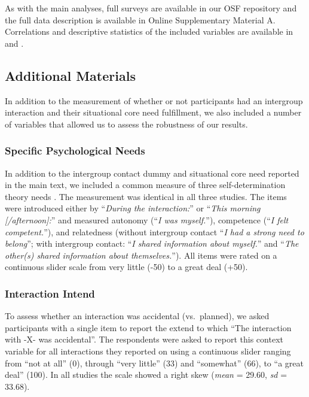 As with the main analyses, full surveys are available in our OSF
repository \citep{KreienkampMasked2022a} and the full data description
is available in Online Supplementary Material A. Correlations and
descriptive statistics of the included variables are available in
 and .

\subsection{Additional Materials}

In addition to the measurement of whether or not participants had an
intergroup interaction and their situational core need fulfillment, we
also included a number of variables that allowed us to assess the
robustness of our results.

\subsubsection{Specific Psychological Needs}

In addition to the intergroup contact dummy and situational core need
reported in the main text, we included a common measure of three
self-determination theory needs \citep[see][]{Downie2008}. The
measurement was identical in all three studies. The items were
introduced either by ``\textit{During the interaction:}'' or
``\textit{This morning [/afternoon]:}'' and measured autonomy
(``\textit{I was myself.}''), competence
(``\textit{I felt competent.}''), and relatedness (without intergroup
contact ``\textit{I had a strong need to belong}''; with intergroup
contact: ``\textit{I shared information about myself.}'' and
``\textit{The other(s) shared information about themselves.}''). All
items were rated on a continuous slider scale from very little (-50) to
a great deal (+50).

\subsubsection{Interaction Intend}

To assess whether an interaction was accidental (vs.~planned), we asked
participants with a single item to report the extend to which ``The
interaction with -X- was accidental''. The respondents were asked to
report this context variable for all interactions they reported on using
a continuous slider ranging from ``not at all'' (0), through ``very
little'' (33) and ``somewhat'' (66), to ``a great deal'' (100). In all
studies the scale showed a right skew (\textit{mean} = 29.60,
\textit{sd} = 33.68).

